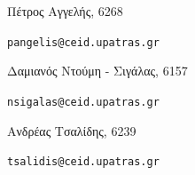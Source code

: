 \begin{center}
\vspace{0.7cm}

Πέτρος Αγγελής, 6268 \par
\texttt{pangelis@ceid.upatras.gr}

\vspace{0.5cm}

Δαμιανός Ντούμη - Σιγάλας, 6157 \par
\texttt{nsigalas@ceid.upatras.gr}

\vspace{0.5cm}

Ανδρέας Τσαλίδης, 6239 \par
\texttt{tsalidis@ceid.upatras.gr}


\end{center}